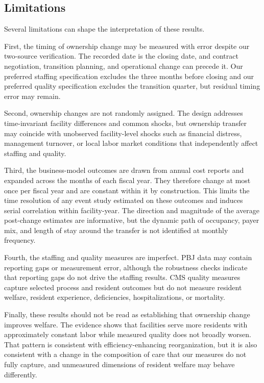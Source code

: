 \documentclass[12pt]{article}
\begin{document}
\subsection{Limitations}

Several limitations can shape the interpretation of these results.

First, the timing of ownership change may be measured with error despite our two-source verification. The recorded date is the closing date, and contract negotiation, transition planning, and operational change can precede it. Our preferred staffing specification excludes the three months before closing and our preferred quality specification excludes the transition quarter, but residual timing error may remain.

Second, ownership changes are not randomly assigned. The design addresses time-invariant facility differences and common shocks, but ownership transfer may coincide with unobserved facility-level shocks such as financial distress, management turnover, or local labor market conditions that independently affect staffing and quality.

Third, the business-model outcomes are drawn from annual cost reports and expanded across the months of each fiscal year. They therefore change at most once per fiscal year and are constant within it by construction. This limits the time resolution of any event study estimated on these outcomes and induces serial correlation within facility-year. The direction and magnitude of the average post-change estimates are informative, but the dynamic path of occupancy, payer mix, and length of stay around the transfer is not identified at monthly frequency.

Fourth, the staffing and quality measures are imperfect. PBJ data may contain reporting gaps or measurement error, although the robustness checks indicate that reporting gaps do not drive the staffing results. CMS quality measures capture selected process and resident outcomes but do not measure resident welfare, resident experience, deficiencies, hospitalizations, or mortality.

Finally, these results should not be read as establishing that ownership change improves welfare. The evidence shows that facilities serve more residents with approximately constant labor while measured quality does not broadly worsen. That pattern is consistent with efficiency-enhancing reorganization, but it is also consistent with a change in the composition of care that our measures do not fully capture, and unmeasured dimensions of resident welfare may behave differently.
\end{document}
